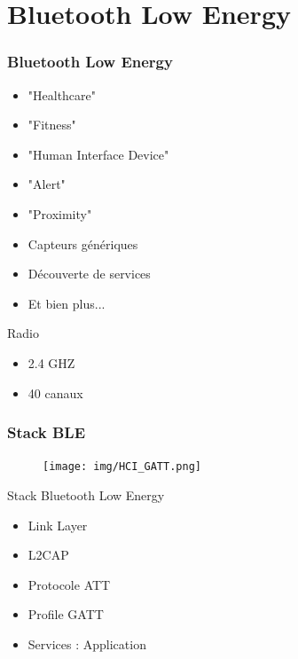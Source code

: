 \section{Bluetooth Low Energy}

\begin{frame}
	\frametitle{Bluetooth Low Energy}
	\begin{minipage}[t]{0.66\linewidth}
		\vspace{0.5cm}
		\vspace{0.5cm}
		\begin{itemize}
			\item "Healthcare"
			\item "Fitness"
			\item "Human Interface Device"
			\item "Alert"
			\item "Proximity"
			\item Capteurs génériques
			\item Découverte de services
			\item Et bien plus...
		\end{itemize}
	\end{minipage}
	\begin{minipage}[t]{0.30\linewidth}
		\vspace{0.5cm}
		\begin{block}{Radio}
			\begin{itemize}
				\item 2.4 GHZ
				\item 40 canaux
			\end{itemize}
		\end{block}
	\end{minipage}
\end{frame}

\begin{frame}
	\frametitle{Stack BLE}
	\begin{minipage}{0.45\linewidth}
		\begin{figure}
			\texttt{[image: img/HCI\_GATT.png]}
		\end{figure}
	\end{minipage}
	\begin{minipage}{0.50\linewidth}
		\begin{block}{Stack Bluetooth Low Energy}
			\begin{itemize}
				\item Link Layer
				\item L2CAP
				\item Protocole ATT
				\item Profile GATT
				\item Services : Application
			\end{itemize}
		\end{block}
	\end{minipage}
\end{frame}

